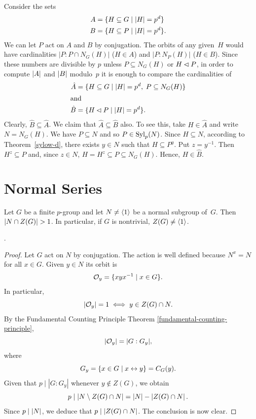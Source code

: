 \begin{solution}
Consider the sets
    \begin{align*}
        A &= \{H\subseteq G\mid \left\vert{H}\right\vert=p^d\}\\
        B &= \{H\subseteq P\mid \left\vert{H}\right\vert=p^d\}.
    \end{align*}
    We can let $P$ act on $A$ and $B$ by conjugation. The orbits of any given~$H$ would have cardinalities $|P:P\cap N_G(H)|$ ($H\in A$) and $|P:N_P(H)|$ ($H\in B$). Since these numbers are divisible by $p$ unless $P\subseteq N_G(H)$ or $H\lhd P$, in order to compute $\left\vert{A}\right\vert$ and $\left\vert{B}\right\vert$ modulo~$p$ it is enough to compare the cardinalities of
    \begin{align*}
        \hat A &= \{H\subseteq G\mid \left\vert{H}\right\vert=p^d,\;P\subseteq N_G(H)\}\\
        \intertext{and}
        \hat B &= \{H\lhd P\mid \left\vert{H}\right\vert=p^d\}.
    \end{align*}
    Clearly, $\hat B\subseteq\hat A$. We claim that $\hat A\subseteq\hat B$ also. To see this, take $H\in\hat A$ and write $N=N_G(H)$. We have $P\subseteq N$ and so $P\in{\rm Syl}_p(N)$. Since $H\subseteq N$, according to Theorem~\ref{sylow-d}, there exists $y\in N$ such that $H\subseteq P^y$. Put $z=y^{-1}$. Then $H^z\subseteq P$ and, since $z\in N$, $H=H^z\subseteq P\subseteq N_G(H)$. Hence, $H\in\hat B$.  \end{solution}

\section{Normal Series}

\begin{thm}\label{nontrivial-center}
    Let $G$ be a finite $p$-group and let $N\ne\langle1\rangle$ be a normal subgroup of\/~$G$. Then $\left\vert{N\cap Z(G)}\right\vert>1$. In particular, if\/ $G$ is nontrivial, $Z(G)\ne\langle1\rangle$.

    \textrm{.}
\end{thm}

\begin{proof} Let $G$ act on $N$ by conjugation. The action is well defined because $N^x=N$ for all $x\in G$. Given $y\in N$ its orbit is
$$
    {\cal O}_y = \{xyx^{-1}\mid x\in G\}.
$$
In particular,
$$
    |{\cal O}_y| = 1 \iff y\in Z(G)\cap N.
$$
By the Fundamental Counting Principle Theorem \ref{fundamental-counting-principle},
$$
    |{\cal O}_y| = |G: G_y|,
$$
where
$$
    G_y = \{x\in G\mid x\leftrightarrow y\} = C_G(y).
$$
Given that $p\mid|G:G_y|$ whenever $y\notin Z(G)$, we obtain
$$
    p\mid |N\setminus Z(G)\cap N|=\left\vert{N}\right\vert-\left\vert{Z(G)\cap N}\right\vert.
$$
Since $p\mid\left\vert{N}\right\vert$, we deduce that $p\mid\left\vert{Z(G)\cap N}\right\vert$. The conclusion is now clear.  \end{proof}

